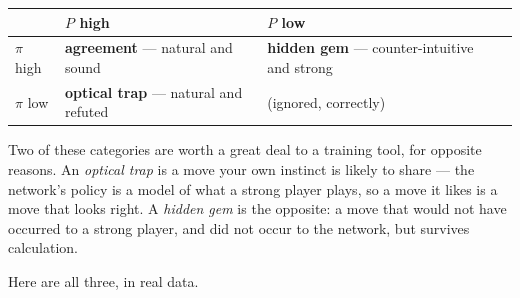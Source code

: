 \begin{center}
\begin{tabular}{@{}llll@{}}
\toprule
 & $P$ high & $P$ low \\
\midrule
$\pi$ high & \textbf{agreement} --- natural and sound & \textbf{hidden gem} --- counter-intuitive and strong \\
$\pi$ low  & \textbf{optical trap} --- natural and refuted & (ignored, correctly) \\
\bottomrule
\end{tabular}
\end{center}

Two of these categories are worth a great deal to a training tool, for opposite reasons. An
\emph{optical trap} is a move your own instinct is likely to share --- the network's policy
is a model of what a strong player plays, so a move it likes is a move that looks right. A
\emph{hidden gem} is the opposite: a move that would not have occurred to a strong player,
and did not occur to the network, but survives calculation.

Here are all three, in real data.

